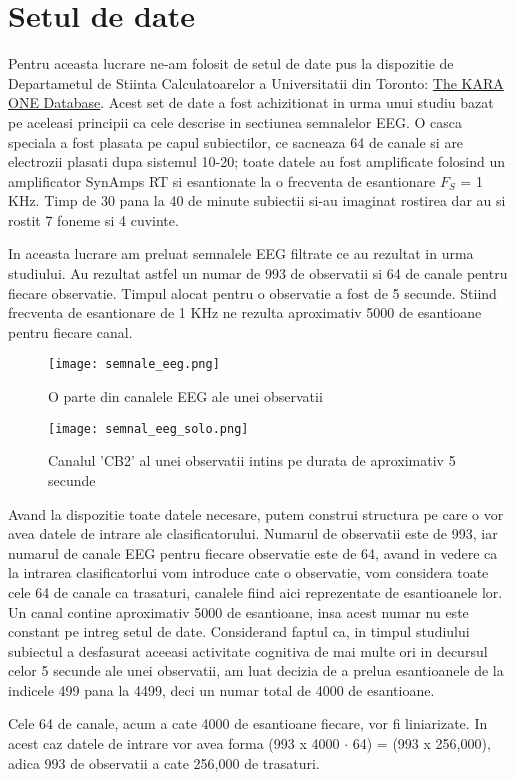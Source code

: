 \section{Setul de date}

\quad Pentru aceasta lucrare ne-am folosit de setul de date pus la dispozitie de 
Departametul de Stiinta Calculatoarelor a Universitatii din Toronto: 
\href{http://www.cs.toronto.edu/~complingweb/data/karaOne/karaOne.html}
{The KARA ONE Database}. Acest set de date a fost achizitionat in urma unui studiu
bazat pe aceleasi principii ca cele descrise in sectiunea semnalelor EEG. 
O casca speciala a fost plasata pe capul subiectilor, ce sacneaza 64 de canale
si are electrozii plasati dupa sistemul 10-20; toate datele au fost amplificate
folosind un amplificator SynAmps RT si esantionate la o frecventa de 
esantionare $ F_S  $ = 1 KHz. Timp de 30 pana la 40 de minute subiectii si-au imaginat
rostirea dar au si rostit 7 foneme si 4 cuvinte.


\quad In aceasta lucrare am preluat semnalele EEG filtrate ce au rezultat in urma 
studiului. Au rezultat astfel un numar de 993 de observatii si 64 de canale pentru fiecare
observatie. Timpul alocat pentru o observatie a fost de 5 secunde. Stiind frecventa de 
esantionare de 1 KHz ne rezulta aproximativ 5000 de esantioane pentru fiecare canal.

\begin{figure}[H]
	\texttt{[image: semnale\_eeg.png]}
	\centering
	\caption{O parte din canalele EEG ale unei observatii}
\end{figure}

\begin{figure}[H]
	\texttt{[image: semnal\_eeg\_solo.png]}
	\centering
	\caption{Canalul 'CB2' al unei observatii intins pe durata de aproximativ 5 secunde}
\end{figure}



\quad Avand la dispozitie toate datele necesare, putem construi structura pe care o vor
avea datele de intrare ale clasificatorului. Numarul de observatii este de 993, iar 
numarul de canale EEG pentru fiecare observatie este de 64, avand in vedere ca la
intrarea clasificatorlui vom introduce cate o observatie, vom considera toate cele 64 de 
canale ca trasaturi, canalele fiind aici reprezentate de esantioanele lor. 
Un canal contine aproximativ 5000 de esantioane, insa acest numar nu este constant pe intreg setul de date. 
Considerand faptul ca, in timpul studiului subiectul a desfasurat aceeasi 
activitate cognitiva de mai multe ori in decursul celor 5 secunde ale unei observatii, am luat decizia de a
prelua esantioanele de la indicele 499 pana la 4499, deci un numar total de 4000
de esantioane.

Cele 64 de canale, acum a cate 4000 de esantioane fiecare, vor fi liniarizate. In 
acest caz datele de intrare vor avea forma (993 x 4000 $ \cdot $ 64)
 =  (993 x 256,000), adica 993 de observatii a cate 256,000 de trasaturi.
